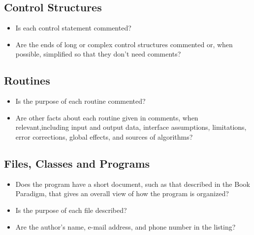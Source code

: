 \subsection{Control Structures}
\begin{itemize}
\item Is each control statement commented?
\item Are the ends of long or complex control structures commented or, when possible, simplified so that they don’t need comments?
\end{itemize}

\subsection{Routines}
\begin{itemize}
\item Is the purpose of each routine commented?
\item Are other facts about each routine given in comments, when relevant,including input and output data, interface assumptions, limitations, error corrections, global effects, and sources of algorithms?
\end{itemize}

\subsection{Files, Classes and Programs}
\begin{itemize}
\item Does the program have a short document, such as that described in the Book Paradigm, that gives an overall view of how the program is organized?
\item Is the purpose of each file described?
\item Are the author’s name, e-mail address, and phone number in the listing?
\end{itemize}